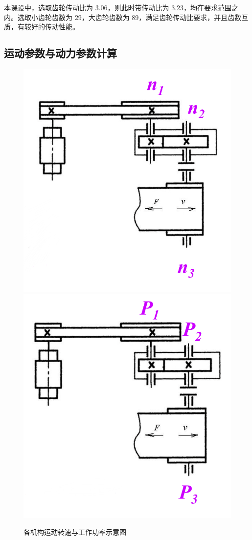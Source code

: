 \documentclass[12pt]{ctexart}
\begin{document}
本课设中，选取齿轮传动比为 3.06，则此时带传动比为 3.23，均在要求范围之内。选取小齿轮齿数为 29，大齿轮齿数为 89，满足齿轮传动比要求，并且齿数互质，有较好的传动性能。

\subsection{运动参数与动力参数计算}

\begin{figure}[htbp]
    \centering
    \includegraphics[scale=0.2]{dynamic_argument.png}
    \quad
    \includegraphics[scale=0.2]{P.png}
    \caption{各机构运动转速与工作功率示意图}\label{figure1}
\end{figure}
\end{document}
